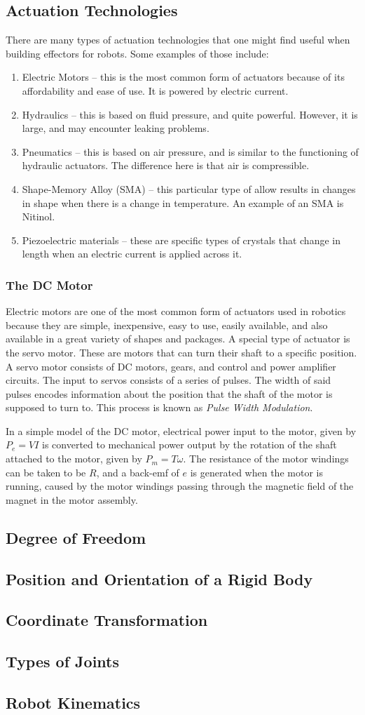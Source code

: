 \subsection{Actuation Technologies}
There are many types of actuation technologies that one might find useful when building effectors for robots. Some examples of those include:
\begin{enumerate}
    \item Electric Motors -- this is the most common form of actuators because of its affordability and ease of use. It is powered by electric current.
    \item Hydraulics -- this is based on fluid pressure, and quite powerful. However, it is large, and may encounter leaking problems.
    \item Pneumatics -- this is based on air pressure, and is similar to the functioning of hydraulic actuators. The difference here is that air is compressible.
    \item Shape-Memory Alloy (SMA) -- this particular type of allow results in changes in shape when there is a change in temperature. An example of an SMA is Nitinol.
    \item Piezoelectric materials -- these are specific types of crystals that change in length when an electric current is applied across it.
\end{enumerate}
\subsubsection{The DC Motor}
Electric motors are one of the most common form of actuators used in robotics because they are simple, inexpensive, easy to use, easily available, and also available in a great variety of shapes and packages. A special type of actuator is the servo motor. These are motors that can turn their shaft to a specific position. A servo motor consists of DC motors, gears, and control and power amplifier circuits. The input to servos consists of a series of pulses. The width of said pulses encodes information about the position that the shaft of the motor is supposed to turn to. This process is known as \emph{Pulse Width Modulation}. 

In a simple model of the DC motor, electrical power input to the motor, given by $P_e = VI$ is converted to mechanical power output by the rotation of the shaft attached to the motor, given by $P_m = T\omega$. The resistance of the motor windings can be taken to be $R$, and a back-emf of $e$ is generated when the motor is running, caused by the motor windings passing through the magnetic field of the magnet in the motor assembly.
\subsection{Degree of Freedom}
\subsection{Position and Orientation of a Rigid Body}
\subsection{Coordinate Transformation}
\subsection{Types of Joints}
\subsection{Robot Kinematics}